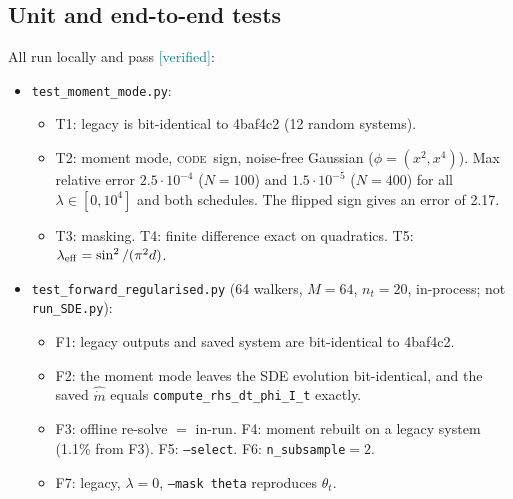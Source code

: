 \documentclass[11pt,a4paper]{article}
\newcommand{\code}[1]{\texttt{#1}}
\newcommand{\ver}{\textcolor{teal}{\textsf{[verified]}}}
\newcommand{\cs}{\textsc{code}}
\begin{document}
\subsection{Unit and end-to-end tests}\label{sec:tests}
All run locally and pass \ver:
\begin{itemize}
\item \code{test\_moment\_mode.py}:
  \begin{itemize}
    \item T1: legacy is bit-identical to 4baf4c2 (12 random systems).
    \item T2: moment mode, \cs\ sign, noise-free Gaussian ($\phi=(x^2,x^4)$). Max relative error $2.5\cdot10^{-4}$ ($N=100$) and $1.5\cdot10^{-5}$ ($N=400$)
          for all $\lambda\in[0,10^4]$ and both schedules. The flipped sign gives an error of 2.17.
    \item T3: masking. T4: finite difference exact on quadratics. T5: $\lambda_{\rm eff}=\sin^2/(\pi^2d)$.
  \end{itemize}
\item \code{test\_forward\_regularised.py} (64 walkers, $M=64$, $n_t=20$, in-process; not \code{run\_SDE.py}):
  \begin{itemize}
    \item F1: legacy outputs and saved system are bit-identical to 4baf4c2.
    \item F2: the moment mode leaves the SDE evolution bit-identical, and the saved $\hat{\dot m}$ equals \code{compute\_rhs\_dt\_phi\_I\_t} exactly.
    \item F3: offline re-solve $=$ in-run. F4: moment rebuilt on a legacy system (1.1\% from F3). F5: \code{--select}. F6: \code{n\_subsample}$=2$.
    \item F7: legacy, $\lambda=0$, \code{--mask theta} reproduces $\theta_t$.
  \end{itemize}
\end{itemize}
\end{document}
